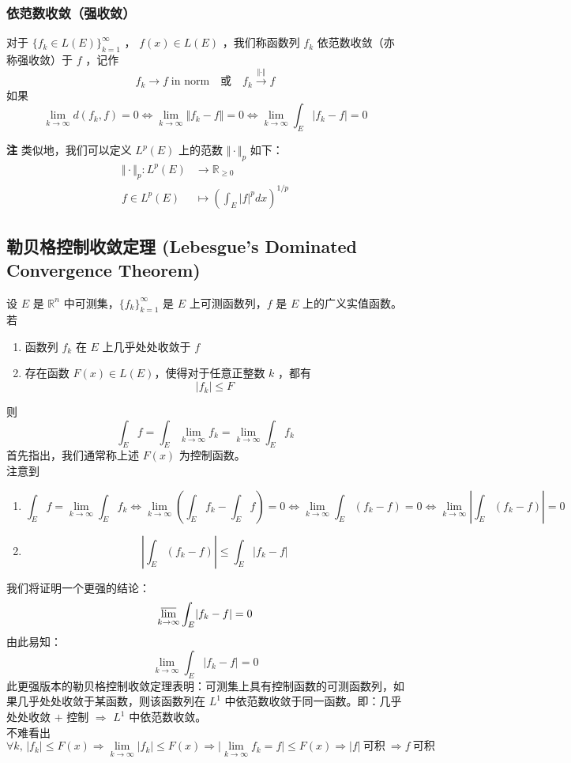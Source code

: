 \documentclass{ctexbook}
\newcommand{\no}{\noindent}
\newcommand{\pro}{\no{\bf 证明：}}
\newcommand{\R}{\mathbb{R}}
\newcommand{\ITEMS}{\begin{enumerate}[leftmargin=4em]}
\newcommand{\ITEME}{\end{enumerate}}
\begin{document}
\subsubsection{依范数收敛（强收敛）}

对于 $\{f_k \in L(E)\}_{k=1}^\infty$ ， $f(x)\in L(E)$ ，我们称函数列 $f_k$ 依范数收敛（亦称强收敛）于 $f$ ，记作
\[
	f_k \to f \; \text{in norm}\quad\mbox{或}\quad f_k \xrightarrow{\Vert\cdot\Vert} f
\]
如果
\[
	\lim_{k\to\infty} d(f_k,f) = 0 \iff \lim_{k\to\infty} \Vert f_k - f \Vert = 0 \iff \lim_{k\to\infty} \int_E \lvert f_k - f \rvert = 0
\]

{\bf 注} 类似地，我们可以定义 $L^p(E)$ 上的范数 $\Vert\cdot\Vert_p$ 如下：
\[
\begin{aligned}
	\Vert\cdot\Vert_p: L^p(E) &\to \R_{\ge0}\\
	f\in L^p(E) &\mapsto \left(\int_E |f|^p dx\right)^{1/p}
\end{aligned}
\]

\subsection{勒贝格控制收敛定理 (Lebesgue's Dominated Convergence Theorem)}
设 $E$ 是 $\R^n$ 中可测集，$\{f_k\}_{k=1}^\infty$ 是 $E$ 上可测函数列，$f$ 是 $E$ 上的广义实值函数。若
\ITEMS
	\item 函数列 $f_k$ 在 $E$ 上几乎处处收敛于 $f$
	\item 存在函数 $F(x)\in L(E)$，使得对于任意正整数 $k$ ，都有
	\[
		\lvert f_k \rvert \le F
	\]
\ITEME 
则
\[
	\int_E f=\int_E \lim_{k\to\infty} f_k=\lim_{k\to\infty} \int_E f_k
\]
\pro 首先指出，我们通常称上述 $F(x)$ 为控制函数。\\
注意到
\ITEMS
	\item 
\[
	\int_E f=\lim_{k\to\infty} \int_E f_k\iff \lim_{k\to\infty} \left(\int_E f_k - \int_E  f\right) = 0 \iff \lim_{k\to\infty} \int_E \left(f_k - f\right) = 0 \iff \lim_{k\to\infty} \left\lvert \int_E \left(f_k - f\right) \right\rvert = 0
\]
	\item
\[
	\left\lvert \int_E (f_k - f) \right\rvert \le \int_E \lvert f_k - f\rvert
\]
\ITEME
我们将证明一个更强的结论：
\[
	\varlimsup_{k\to\infty}\int_E \lvert f_k - f\rvert = 0
\]
由此易知： 
$$\lim_{k\to\infty}\int_E \lvert f_k - f\rvert = 0$$ 
此更强版本的勒贝格控制收敛定理表明：可测集上具有控制函数的可测函数列，如果几乎处处收敛于某函数，则该函数列在 $L^1$ 中依范数收敛于同一函数。即：几乎处处收敛 $+$ 控制 $\Rightarrow$ $L^1$ 中依范数收敛。\\
不难看出
\[
	\forall k , \, \lvert f_k \rvert \le F(x) \Rightarrow \lim_{k\to\infty} \lvert f_k \rvert\le F(x) \Rightarrow \lvert\lim_{k\to\infty} f_k=f\rvert\le F(x) \Rightarrow \lvert f \rvert\ \mbox{可积}\ \Rightarrow f\ \mbox{可积}
\]
\end{document}
